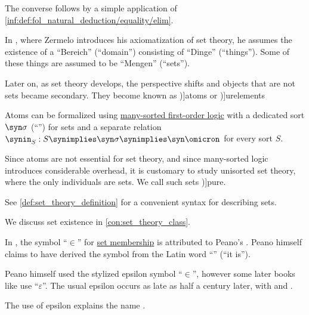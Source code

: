 \begin{definition}
\begin{thmenum}
    The converse follows by a simple application of \ref{inf:def:fol_natural_deduction/equality/elim}.

    \mimprovised In \cite{Zermelo2010Collection:GrundlagenDerMengenlehre}, where Zermelo introduces his axiomatization of set theory, he assumes the existence of a \enquote{Bereich} (\enquote{domain}) consisting of \enquote{Dinge} (\enquote{things}). Some of these things are assumed to be \enquote{Mengen} (\enquote{sets}).

    Later on, as set theory develops, the perspective shifts and objects that are not sets became secondary. They become known as \term[en=atom (\cite[27]{Schechter1997AnalysisHandbook})]{atoms} or \term[en=urelement (\cite[238]{Shoenfield1967MathematicalLogic})]{urelements}

    Atoms can be formalized using \hyperref[def:many_sorted_fol]{many-sorted first-order logic} with a dedicated sort \( \syn\sigma \) (\enquote{}) for sets and a separate relation \( \synin_S: S \synimplies \syn\sigma \synimplies \syn\omicron \) for every sort \( S \).

    Since atoms are not essential for set theory, and since many-sorted logic introduces considerable overhead, it is customary to study unisorted set theory, where the only individuals are sets. We call such sets \term[en=pure (sets) (\cite[238]{Shoenfield1967MathematicalLogic})]{pure}.
  \end{thmenum}
\end{definition}
\begin{comments}
  \item See \cref{def:set_theory_definition} for a convenient syntax for describing sets.
  \item We discuss set existence in \cref{con:set_theory_class}.
\end{comments}

\begin{remark}\label{rem:epsilon_and_set_membership}
  In \cite{MacTutor:EarliestUsesOfLogicSymbols}, the symbol \enquote{\( \in \)} for \hyperref[def:axiomatic_set_theory]{set membership} is attributed to Peano's \cite{Peano1889ArithmeticesPrincipia}. Peano himself claims to have derived the symbol from the Latin word \enquote{} (\enquote{it is}).

  Peano himself used the stylized epsilon symbol \enquote{\( \in \)}, however some later books like \cite{Hausdorff1935Mengenlehre} use \enquote{\( \varepsilon \)}. The usual epsilon occurs as late as half a century later, with \cite{Kelley1975GeneralTopology} and \cite{Halmos1976MeasureTheory}.

  The use of epsilon explains the name .
\end{remark}

